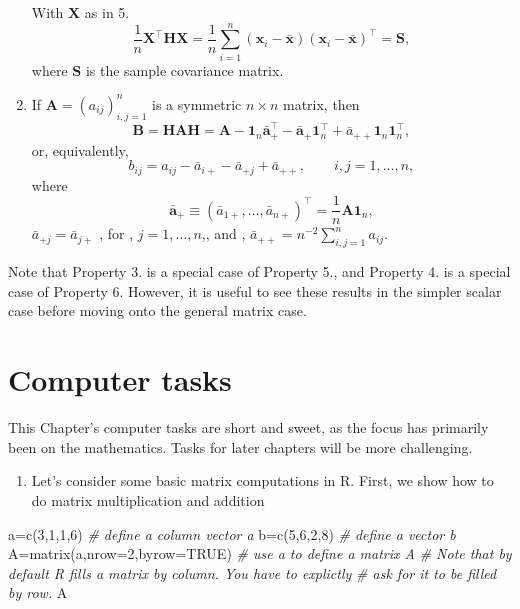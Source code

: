 \documentclass[
]{book}
\newenvironment{Shaded}{\begin{snugshade}}{\end{snugshade}}
\newcommand{\AttributeTok}[1]{\textcolor[rgb]{0.77,0.63,0.00}{#1}}
\newcommand{\CommentTok}[1]{\textcolor[rgb]{0.56,0.35,0.01}{\textit{#1}}}
\newcommand{\ConstantTok}[1]{\textcolor[rgb]{0.00,0.00,0.00}{#1}}
\newcommand{\DecValTok}[1]{\textcolor[rgb]{0.00,0.00,0.81}{#1}}
\newcommand{\FunctionTok}[1]{\textcolor[rgb]{0.00,0.00,0.00}{#1}}
\newcommand{\NormalTok}[1]{#1}
\newcommand{\OtherTok}[1]{\textcolor[rgb]{0.56,0.35,0.01}{#1}}
\providecommand{\tightlist}{%
  \setlength{\itemsep}{0pt}\setlength{\parskip}{0pt}}
\theoremstyle{definition}
\theoremstyle{definition}
\theoremstyle{definition}
\theoremstyle{definition}
\theoremstyle{remark}
\begin{document}
\begin{enumerate}
  With \(\mathbf X\) as in 5.
  \[
  \frac{1}{n}\mathbf X^\top \mathbf H\mathbf X=\frac{1}{n} \sum_{i=1}^n (\mathbf x_i -\bar{\mathbf x})(\mathbf x_i -\bar{\mathbf x})^\top =\mathbf S,
  \]
  where \(\mathbf S\) is the sample covariance matrix.
\item
  If \(\mathbf A=(a_{ij})_{i,j=1}^n\) is a symmetric \(n \times n\) matrix, then
  \[
  \mathbf B=\mathbf H\mathbf A\mathbf H= \mathbf A- {\mathbf 1}_n \bar{\mathbf a}_+^\top -\bar{\mathbf a}_+{\mathbf 1}_n^\top +\bar{a}_{++}{\mathbf 1}_n {\mathbf 1}_n^\top,
  \]
  or, equivalently,
  \[
  b_{ij}=a_{ij}-\bar{a}_{i+}-\bar{a}_{+j}+\bar{a}_{++}, \qquad i,j=1, \ldots , n,
  \]
  where
  \[
  \bar{\mathbf a}_{+}\equiv (\bar{a}_{1+}, \ldots , \bar{a}_{n+})^\top=\frac{1}{n}\mathbf A{\mathbf 1}_n,
  \]
  \(\bar{a}_{+j}=\bar{a}_{j+}\) , for , \(j=1, \ldots , n\),, and , \(\bar{a}_{++}=n^{-2}\sum_{i,j=1}^n a_{ij}\).
\end{enumerate}

Note that Property 3. is a special case of Property 5., and Property 4. is a special case of Property 6.
However, it is useful to see these results in the simpler scalar case before moving onto the general matrix case.

\hypertarget{tasks-ch2}{%
\section{Computer tasks}\label{tasks-ch2}}

This Chapter's computer tasks are short and sweet, as the focus has primarily been on the mathematics. Tasks for later chapters will be more challenging.

\begin{enumerate}
\def\labelenumi{\arabic{enumi}.}
\setcounter{enumi}{-1}
\tightlist
\item
  Let's consider some basic matrix computations in R. First, we show how to do matrix multiplication and addition
\end{enumerate}

\begin{Shaded}
\begin{Highlighting}[]
\NormalTok{a}\OtherTok{=}\FunctionTok{c}\NormalTok{(}\DecValTok{3}\NormalTok{,}\DecValTok{1}\NormalTok{,}\DecValTok{1}\NormalTok{,}\DecValTok{6}\NormalTok{)                     }\CommentTok{\# define a column  vector a}
\NormalTok{b}\OtherTok{=}\FunctionTok{c}\NormalTok{(}\DecValTok{5}\NormalTok{,}\DecValTok{6}\NormalTok{,}\DecValTok{2}\NormalTok{,}\DecValTok{8}\NormalTok{)                     }\CommentTok{\# define a  vector b}
\NormalTok{A}\OtherTok{=}\FunctionTok{matrix}\NormalTok{(a,}\AttributeTok{nrow=}\DecValTok{2}\NormalTok{,}\AttributeTok{byrow=}\ConstantTok{TRUE}\NormalTok{)    }\CommentTok{\# use a to define a matrix A}
\CommentTok{\# Note that by default R fills a matrix by column. You have to explictly}
\CommentTok{\# ask for it to be filled by row.}
\NormalTok{A}
\end{Highlighting}
\end{Shaded}
\end{document}
